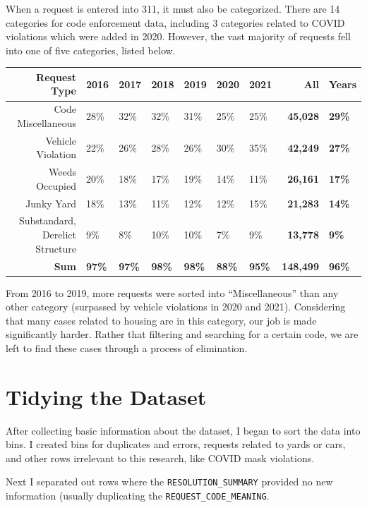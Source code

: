 \documentclass[
]{book}
\begin{document}
When a request is entered into 311, it must also be categorized. There are 14 categories for code enforcement data, including 3 categories related to COVID violations which were added in 2020. However, the vast majority of requests fell into one of five categories, listed below.

\begin{longtable}[]{@{}rllllllrl@{}}
\toprule
Request Type & 2016 & 2017 & 2018 & 2019 & 2020 & 2021 & All & Years \\
\midrule
\endhead
Code Miscellaneous & 28\% & 32\% & 32\% & 31\% & 25\% & 25\% & \textbf{45,028} & \textbf{29\%} \\
Vehicle Violation & 22\% & 26\% & 28\% & 26\% & 30\% & 35\% & \textbf{42,249} & \textbf{27\%} \\
Weeds Occupied & 20\% & 18\% & 17\% & 19\% & 14\% & 11\% & \textbf{26,161} & \textbf{17\%} \\
Junky Yard & 18\% & 13\% & 11\% & 12\% & 12\% & 15\% & \textbf{21,283} & \textbf{14\%} \\
Substandard, Derelict Structure & 9\% & 8\% & 10\% & 10\% & 7\% & 9\% & \textbf{13,778} & \textbf{9\%} \\
\textbf{Sum} & \textbf{97\%} & \textbf{97\%} & \textbf{98\%} & \textbf{98\%} & \textbf{88\%} & \textbf{95\%} & \textbf{148,499} & \textbf{96\%} \\
\bottomrule
\end{longtable}

From 2016 to 2019, more requests were sorted into ``Miscellaneous'' than any other category (surpassed by vehicle violations in 2020 and 2021). Considering that many cases related to housing are in this category, our job is made significantly harder. Rather that filtering and searching for a certain code, we are left to find these cases through a process of elimination.

\hypertarget{tidying-the-dataset}{%
\section{Tidying the Dataset}\label{tidying-the-dataset}}

After collecting basic information about the dataset, I began to sort the data into bins. I created bins for duplicates and errors, requests related to yards or cars, and other rows irrelevant to this research, like COVID mask violations.

Next I separated out rows where the \texttt{RESOLUTION\_SUMMARY} provided no new information (usually duplicating the \texttt{REQUEST\_CODE\_MEANING}.
\end{document}
